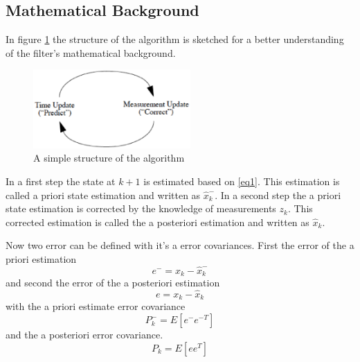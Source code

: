 \subsection*{Mathematical Background}\label{math_kalman}
In figure \ref{simple_schematic} the structure of the algorithm is sketched for a better understanding of the filter's mathematical background. 
\begin{figure}[h]
\begin{center}
\includegraphics[width=6cm]{pictures/simple_schematic_algo.eps}
\caption{A simple structure of the algorithm}
\label{simple_schematic}
\end{center}
\end{figure}
In a first step the state at $k+1$ is estimated based on \ref{eq1}. This estimation is called a priori state estimation and written as $\hat{x}_k^{-}$. In a second step the a priori state estimation is corrected by the knowledge of measurements $z_k$. This corrected estimation is called the a posteriori estimation and written as $\hat{x}_k$.

Now two error can be defined with it's a error covariances. First the error of the a priori estimation 
\begin{equation}
e^{-}=x_k-\hat{x}_k^{-}
\end{equation}
and second the error of the a posteriori estimation 
\begin{equation}
e=x_k-\hat{x}_k
\end{equation}
with the a priori estimate error covariance 
\begin{equation}
P^{-}_k=E[e^{-}e^{-T}]
\end{equation}
and the a posteriori error covariance.
\begin{equation}
P_k=E[ee^{T}]\label{P_post}
\end{equation}

